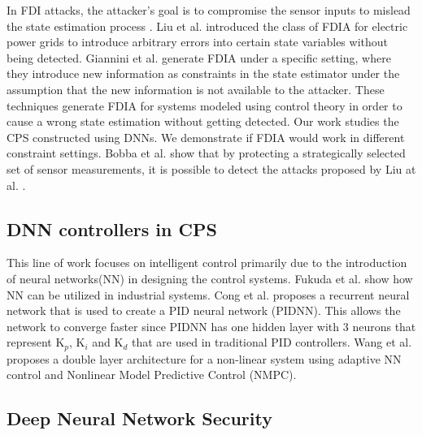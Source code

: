 In FDI attacks, the attacker's goal is to compromise the sensor inputs to mislead the state estimation process \cite{e3f0020abba24d4389aff937fe8bcdd5}. Liu et al. \cite{10.1145/1952982.1952995} introduced the class of FDIA for electric power grids to introduce arbitrary errors into certain state variables without being detected. Giannini et al. \cite{unknown} generate FDIA under a specific setting, 
where they introduce new information as constraints in the state estimator under the assumption that the new information is not available to the attacker. These techniques generate FDIA for systems modeled using control theory in order to cause a wrong state estimation without getting detected. Our work studies the CPS constructed using \ac{DNN}s. We demonstrate if  \ac{FDIA} would work in different constraint settings. 
Bobba et al. \cite{Bobba2010DetectingFD} show that by protecting a strategically selected set of sensor measurements, it is possible to detect the attacks proposed by Liu at al. \cite{10.1145/1952982.1952995}.

\subsection{DNN controllers in CPS}
This line of work focuses on intelligent control primarily due to the introduction of neural networks(NN) in designing the control systems. %
Fukuda et al. \cite{170966} show how NN can be utilized in industrial systems. Cong et al. \cite{Cong} proposes a recurrent neural network that is used to create a PID neural network (PIDNN). This allows the network to converge faster since PIDNN has one hidden layer with 3 neurons that represent K$_p$, K$_i$ and K$_d$ that are used in traditional PID controllers. Wang et al. \cite{Wang2016ACA} proposes a double layer architecture for a non-linear system using adaptive NN control and Nonlinear Model Predictive Control (NMPC).

\subsection{Deep Neural Network Security}

